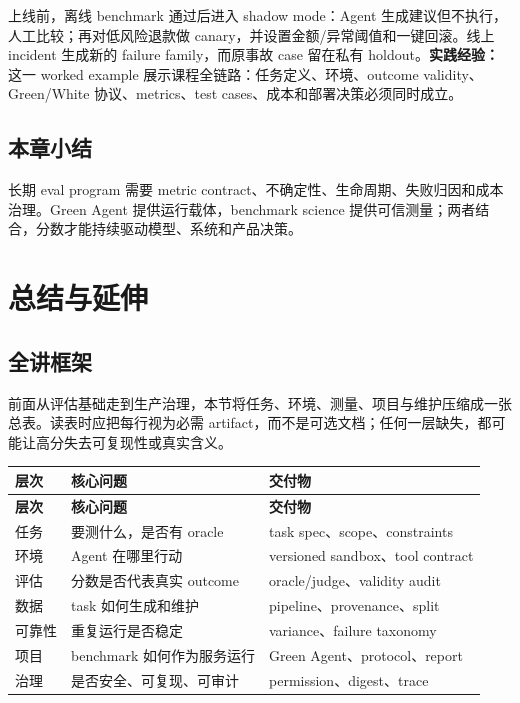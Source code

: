 \documentclass[a4paper]{article}
\begin{document}
上线前，离线 benchmark 通过后进入 shadow mode：Agent 生成建议但不执行，人工比较；再对低风险退款做 canary，并设置金额/异常阈值和一键回滚。线上 incident 生成新的 failure family，而原事故 case 留在私有 holdout。\textbf{实践经验：}这一 worked example 展示课程全链路：任务定义、环境、outcome validity、Green/White 协议、metrics、test cases、成本和部署决策必须同时成立。

\subsection{本章小结}

长期 eval program 需要 metric contract、不确定性、生命周期、失败归因和成本治理。Green Agent 提供运行载体，benchmark science 提供可信测量；两者结合，分数才能持续驱动模型、系统和产品决策。

\section{总结与延伸}

\subsection{全讲框架}

前面从评估基础走到生产治理，本节将任务、环境、测量、项目与维护压缩成一张总表。读表时应把每行视为必需 artifact，而不是可选文档；任何一层缺失，都可能让高分失去可复现性或真实含义。

\begin{longtable}{p{2.7cm}p{4.3cm}p{4.1cm}}
\toprule
\textbf{层次} & \textbf{核心问题} & \textbf{交付物} \\
\midrule
\endfirsthead
\toprule
\textbf{层次} & \textbf{核心问题} & \textbf{交付物} \\
\midrule
\endhead
任务 & 要测什么，是否有 oracle & task spec、scope、constraints \\
环境 & Agent 在哪里行动 & versioned sandbox、tool contract \\
评估 & 分数是否代表真实 outcome & oracle/judge、validity audit \\
数据 & task 如何生成和维护 & pipeline、provenance、split \\
可靠性 & 重复运行是否稳定 & variance、failure taxonomy \\
项目 & benchmark 如何作为服务运行 & Green Agent、protocol、report \\
治理 & 是否安全、可复现、可审计 & permission、digest、trace \\
\bottomrule
\end{longtable}
\end{document}
